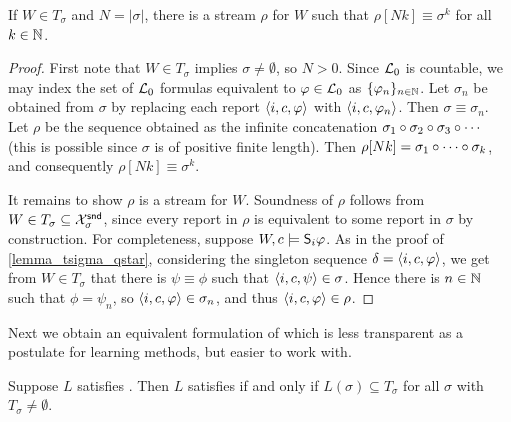 \begin{lemma}
    \label{lemma_pseudostream_to_stream}
    If $W \in T_\sigma$ and $N = |\sigma|$, there is a stream $\rho$ for $W$
    such that $\rho[Nk] \equiv \sigma^k$ for all $k \in \N$.
\end{lemma}

\begin{proof}

    First note that $W \in T_\sigma$ implies $\sigma \ne \emptyset$, so $N >
    0$. Since $\Lprop$ is countable, we may index the set of $\Lprop$ formulas
    equivalent to $\phi \in \Lprop$ as $\{\phi_n\}_{n \in \N}$. Let $\sigma_n$
    be obtained from $\sigma$ by replacing each report $\tuple{i, c, \phi}$
    with $\tuple{i, c, \phi_n}$. Then $\sigma \equiv \sigma_n$.
    Let $\rho$ be the sequence obtained as the infinite concatenation $\sigma_1
    \seqappend \sigma_2 \seqappend \sigma_3 \seqappend \cdots$ (this is
    possible since $\sigma$ is of positive finite length). Then $\rho[Nk] =
    \sigma_1 \seqappend \cdots \seqappend \sigma_k$, and consequently $\rho[Nk]
    \equiv \sigma^k$.

    It remains to show $\rho$ is a stream for $W$. Soundness of $\rho$ follows
    from $W \in T_\sigma \subseteq \Xsnd_\sigma$, since every report in $\rho$
    is equivalent to some report in $\sigma$ by construction. For completeness,
    suppose $W, c \models \S_i\phi$. As in the proof of
    \cref{lemma_tsigma_qstar}, considering the singleton sequence $\delta =
    \tuple{i, c, \phi}$, we get from $W \in T_\sigma$ that there is $\psi
    \equiv \phi$ such that $\tuple{i, c, \psi} \in \sigma$. Hence there is $n
    \in \N$ such that $\phi = \psi_n$, so $\tuple{i, c, \phi} \in \sigma_n$,
    and thus $\tuple{i, c, \phi} \in \rho$.
\end{proof}

Next we obtain an equivalent formulation of
\credulity{} which is less transparent as a
postulate for learning methods, but easier to work with.

\begin{lemma}
    \label{lemma_equivalent_tt_property}
    Suppose $L$ satisfies \soundness{}. Then $L$ satisfies
    \credulity{} if and only if $L(\sigma) \subseteq
    T_\sigma$ for all $\sigma$ with $T_\sigma \ne \emptyset$.
\end{lemma}

